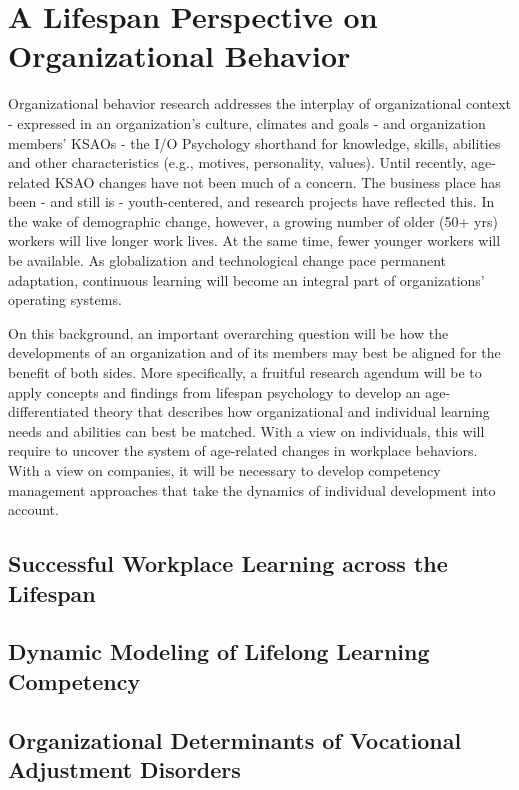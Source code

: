 \section{A Lifespan Perspective on Organizational Behavior}

Organizational behavior research addresses the interplay of organizational context - expressed in an organization's culture, climates and goals - and organization members' KSAOs - the I/O Psychology shorthand for knowledge, skills, abilities and other characteristics (e.g., motives, personality, values). Until recently, age-related KSAO changes have not been much of a concern. The business place has been - and still is - youth-centered, and research projects have reflected this. In the wake of demographic change, however, a growing number of older (50+ yrs) workers will live longer work lives. At the same time, fewer younger workers will be available. As globalization and technological change pace permanent adaptation, continuous learning will become an integral part of organizations' operating systems. 

 On this background, an important overarching question will be how the developments of an organization and of its members may best be aligned for the benefit of both sides. More specifically, a fruitful research agendum will be to apply concepts and findings from lifespan psychology to develop an age-differentiated theory that describes how organizational and individual learning needs and abilities can best be matched. With a view on individuals, this will require to uncover the system of age-related changes in workplace behaviors. With a view on companies, it will be necessary to develop competency management approaches that take the dynamics of individual development into account.

\subsection{Successful Workplace Learning across the Lifespan}



\subsection{Dynamic Modeling of Lifelong Learning Competency}



\subsection{Organizational Determinants of Vocational Adjustment Disorders}

